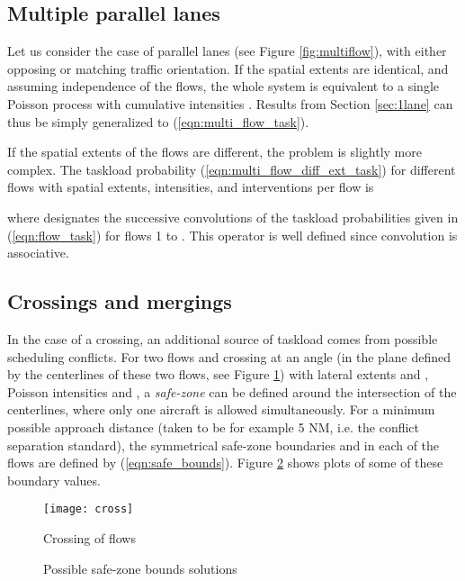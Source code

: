 \documentclass[conference]{IEEEtran}
\begin{document}
\subsection{Multiple parallel lanes}
\label{sec:multilane_model}
Let us consider the case of parallel lanes (see Figure \ref{fig:multiflow}), with either opposing or matching traffic orientation.  If the spatial extents are identical, and assuming independence of the flows, the whole system is equivalent to a single Poisson process with cumulative intensities . Results from Section \ref{sec:1lane} can thus be simply generalized to (\ref{eqn:multi_flow_task}).



If the spatial extents of the flows are different, the problem is slightly more complex. The taskload probability (\ref{eqn:multi_flow_diff_ext_task}) for  different flows with  spatial extents,  intensities, and  interventions per flow is



where  designates the successive convolutions of the  taskload probabilities given in (\ref{eqn:flow_task}) for flows 1 to . This operator is well defined since convolution is associative.

\subsection{Crossings and mergings}

In the case of a crossing, an additional source of taskload comes from possible scheduling conflicts. For two flows  and  crossing at an angle  (in the plane defined by the centerlines of these two flows, see Figure \ref{fig:cross}) with lateral extents  and , Poisson intensities  and , a \emph{safe-zone} can be defined around the intersection of the centerlines, where only one aircraft is allowed simultaneously. For a minimum possible approach distance  (taken to be for example 5 NM, i.e. the conflict separation standard), the symmetrical safe-zone boundaries  and  in each of the flows are defined by (\ref{eqn:safe_bounds}). Figure \ref{fig:safe_bounds} shows plots of some of these boundary values.

\begin{figure}[!h]
\centering
\texttt{[image: cross]}
\caption{Crossing of flows}
\label{fig:cross}
\end{figure}

\begin{figure}[!h]
\centering
{}
\caption{Possible safe-zone bounds solutions}
\label{fig:safe_bounds}
\end{figure}
\end{document}
